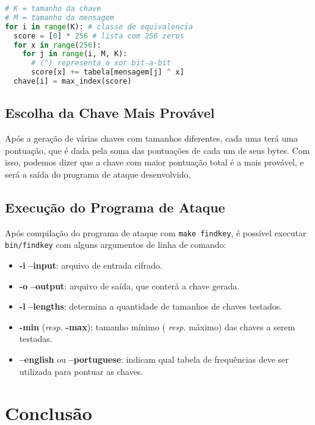 \documentclass[conference]{IEEEtran}
\begin{document}
\begin{lstlisting}[language=Python, caption=Cálculo da pontuação para um tamanho
de chave K]
# K = tamanho da chave
# M = tamanho da mensagem
for i in range(K): # classe de equivalencia
  score = [0] * 256 # lista com 256 zeros
  for x in range(256):
    for j in range(i, M, K):
      # (^) representa o xor bit-a-bit
      score[x] += tabela[mensagem[j] ^ x]
  chave[i] = max_index(score)
\end{lstlisting}
\label{code:idk}

\subsection{Escolha da Chave Mais Provável}
\label{sec:escolha}
Após a geração de várias chaves com tamanhos diferentes, cada uma terá uma
pontuação, que é dada pela soma das pontuações de cada um de seus bytes. Com
isso, podemos dizer que a chave com maior pontuação total é a mais provável, e
será a saída do programa de ataque desenvolvido. 

\subsection{Execução do Programa de Ataque}
\label{sec:exec-attack}

Após compilação do programa de ataque com \verb|make findkey|, é possível
executar \verb|bin/findkey| com alguns argumentos de linha de comando:

\begin{itemize}
    \item \textbf{-i} \textbf{--input}: arquivo de entrada cifrado.
    \item \textbf{-o} \textbf{--output}: arquivo de saída, que conterá a chave
        gerada.
    \item \textbf{-l} \textbf{--lengths}: determina a quantidade de tamanhos de
        chaves testados.
    \item \textbf{-min} (\textit{resp.} \textbf{-max}): tamanho mínimo (
        \textit{resp.} máximo) das chaves a serem testadas.
    \item \textbf{--english} ou \textbf{--portuguese}: indicam qual tabela de
        frequências deve ser utilizada para pontuar as chaves.
\end{itemize}


\section{Conclusão} %
\label{sec:conclusion}
\end{document}
